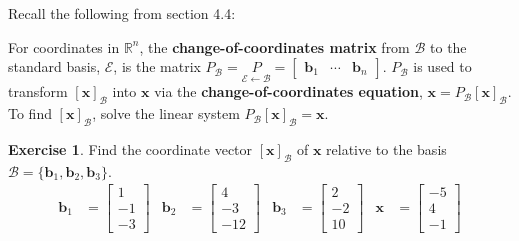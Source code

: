 \documentclass[10pt]{book}
\newcommand{\boxcolor}{gray!30}
\newenvironment{boxdef}{\begin{mdframed}[backgroundcolor=\boxcolor,linewidth=0pt,nobreak=true]}{\end{mdframed}}
\theoremstyle{definition}
\newtheorem{exercise}{Exercise}[section]
\newcommand{\R}{\mathbb{R}}
\newcommand{\B}{\mathscr{B}}
\newcommand{\E}{\mathscr{E}}
\newcommand{\vect}[1]{\ensuremath{\boldsymbol{\mathbf{#1}}}}
\newcommand{\vectB}[1][x]{[\vect{#1}]_\B}
\newcommand{\CoC}[2]{\underset{#2\leftarrow #1}{P}}
\begin{document}
\begin{boxdef}
	Recall the following from section 4.4:
	
	For coordinates in $\R^n$, the \textbf{change-of-coordinates matrix} from $\B$ to the standard basis, $\E$, is the matrix $P_\B=\CoC{\B}{\E}=\begin{bmatrix}\vect{b}_1&\cdots&\vect{b}_n\end{bmatrix}.$
	$P_\B$ is used to transform $\vectB$ into $\vect{x}$ via the \textbf{change-of-coordinates equation}, $\vect{x}=P_\B\vectB$. To find $\vectB$, solve the linear system $P_\B\vectB=\vect{x}$.
\end{boxdef}

\begin{exercise} %
	Find the coordinate vector $\vectB$ of $\vect{x}$ relative to the basis $\B=\{\vect{b}_1,\vect{b}_2,\vect{b}_3\}$.
	\begin{align*}
	\vect{b}_1 &= \begin{bmatrix}1\\-1\\-3\end{bmatrix} &
	\vect{b}_2 &= \begin{bmatrix}4\\-3\\-12\end{bmatrix} &
	\vect{b}_3 &= \begin{bmatrix}2\\-2\\10\end{bmatrix} &
	\vect{x} &= \begin{bmatrix}-5\\4\\-1\end{bmatrix}
	\end{align*}
\end{exercise}
\vfill
\end{document}

